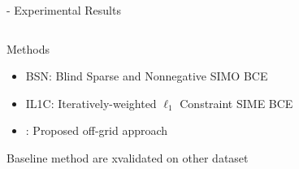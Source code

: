 \begin{frame}[t]{\blaster - Experimental Results}
    \begin{columns}[onlytextwidth]
        \begin{column}{0.45\textwidth}
            \begin{block}{Methods}
                \begin{itemize}
                    \item BSN: Blind Sparse and Nonnegative SIMO BCE
                    \\\cite{lin2007blind}
                    \item IL1C: Iteratively-weighted $\ell_1$ Constraint SIME BCE
                    \\\cite{crocco2015room}
                    \item \blaster: Proposed off-grid approach
                \end{itemize}
            Baseline method are xvalidated on other dataset
            \end{block}
        \end{column}


\end{columns}
\end{frame}
